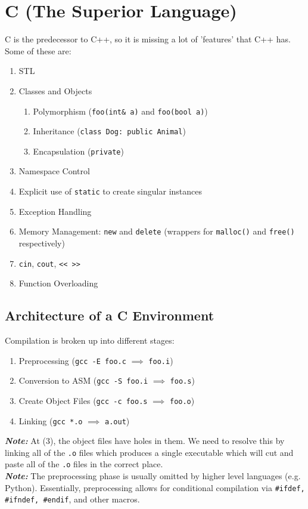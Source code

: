 \documentclass[13pt]{article}
\begin{document}
\section{C (The Superior Language)}
C is the predecessor to C++, so it is missing a lot of 'features' that C++ has. Some of these are:
\begin{enumerate}[label=(\alph*)]
\item STL
\item Classes and Objects
  \begin{enumerate}[label=(\roman*)]
  \item Polymorphism (\texttt{foo(int\& a)} and \texttt{foo(bool a)})
  \item Inheritance (\texttt{class Dog: public Animal})
  \item Encapsulation (\texttt{private})
  \end{enumerate}
\item Namespace Control
\item Explicit use of \texttt{static} to create singular instances
\item Exception Handling
\item Memory Management: \texttt{new} and \texttt{delete} (wrappers for \texttt{malloc()} and \texttt{free()} respectively)
\item \texttt{cin}, \texttt{cout}, \texttt{<< >>}
\item Function Overloading
\end{enumerate}





\subsection{Architecture of a C Environment}
Compilation is broken up into different stages:
\begin{enumerate}[label=(\arabic*)]
\item Preprocessing (\texttt{gcc -E foo.c} $\implies$ \texttt{foo.i})
\item Conversion to ASM (\texttt{gcc -S foo.i} $\implies$ \texttt{foo.s})
\item Create Object Files (\texttt{gcc -c foo.s} $\implies$ \texttt{foo.o})
\item Linking (\texttt{gcc *.o} $\implies$ \texttt{a.out})
\end{enumerate}
\textit{\textbf{Note:}} At (3), the object files have holes in them. We need to resolve this by linking all of the \texttt{.o} files which produces a single executable which will cut and paste all of the \texttt{.o} files in the correct place. \\
\textit{\textbf{Note:}} The preprocessing phase is usually omitted by higher level languages (e.g. Python). Essentially, preprocessing allows for conditional compilation via \texttt{\#ifdef, \#ifndef, \#endif}, and other macros.
\end{document}
